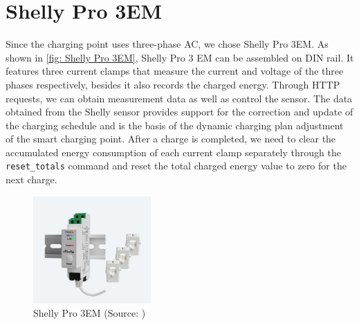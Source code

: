\documentclass[
	english,
	ruledheaders=section,%
	class=report,%
	thesis={type=Report},%
	accentcolor=9c,%
	custommargins=true,%
	marginpar=false,%
	parskip=half-,%
	fontsize=11pt,%
	logofile={img/tuda_logo.pdf}, %
]{tudapub}
\begin{document}
\section{Shelly Pro 3EM}
\label{sec: Shelly Pro 3EM}

Since the charging point uses three-phase AC, we chose Shelly Pro 3EM. As shown in \autoref{fig: Shelly Pro 3EM}, Shelly Pro 3 EM can be assembled on DIN rail. It features three current clamps that measure the current and voltage of the three phases respectively, besides it also records the charged energy. Through HTTP requests, we can obtain measurement data as well as control the sensor. The data obtained from the Shelly sensor provides support for the correction and update of the charging schedule and is the basis of the dynamic charging plan adjustment of the smart charging point. After a charge is completed, we need to clear the accumulated energy consumption of each current clamp separately through the \texttt{reset\_totals} command and reset the total charged energy value to zero for the next charge.

\begin{figure}[htbp]
    \centering
    \includegraphics[width=0.4\textwidth]{img/Shelly Pro 3EM.jpg}
    \caption{Shelly Pro 3EM
    (Source: \cite{Shelly})}
    \label{fig: Shelly Pro 3EM}
\end{figure}

\end{document}
